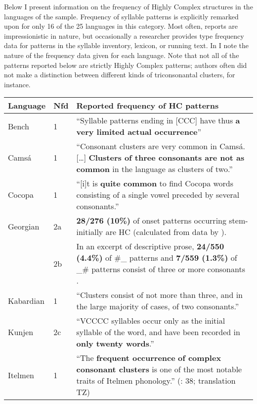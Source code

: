   Below I present information on the frequency of Highly Complex structures in the languages of the sample. Frequency of syllable patterns is explicitly remarked upon for only 16 of the 25 languages in this category. Most often, reports are impressionistic in nature, but occasionally a researcher provides type frequency data for patterns in the syllable inventory, lexicon, or running text. In  I note the nature of the frequency data given for each language. Note that not all of the patterns reported below are strictly Highly Complex patterns; authors often did not make a distinction between different kinds of triconsonantal clusters, for instance.

\begin{sidewaystable}\footnotesize
\begin{tabularx}{\textwidth}{p{1.25cm}lQ}
\lsptoprule
Language & Nfd & Reported frequency of HC patterns\\\midrule
{Bench} & 1 & “Syllable patterns ending in [CCC] have thus \textbf{{a very limited actual occurrence}}” \citep[92]{Rapold2006}\\
{Camsá} & 1 & “Consonant clusters are very common in Camsá. […] \textbf{{Clusters of three consonants are not as common}} in the language as clusters of two.” \citep[81-4]{Howard1967}\\
{Cocopa} & 1 & “[i]t is \textbf{{quite common}} to find Cocopa words consisting of a single vowel preceded by several consonants.” \citep[1]{Bendixen1980}\\
{Georgian} & 2a & \textbf{{28/276 (10\%)}} of onset patterns occurring stem-initially are HC (calculated from data by \citealt[197--205]{Butskhrikidze2002}).\\
            & 2b & In an excerpt of descriptive prose, \textbf{{24/550 (4.4\%)}} of \#\_ patterns and \textbf{{7/559 (1.3\%)}} of \_\# patterns consist of three or more consonants \citep[79-80]{Vogt1958}.\\
{Kabardian} & 1 & “Clusters consist of not more than three, and in the large majority of cases, of two consonants.” \citep[29]{Kuipers1960}\\
{Kunjen} & 2c & “VCCCC syllables occur only as the initial syllable of the word, and have been recorded in \textbf{{only twenty words}}.” \citep[35]{Sommer1969}\\
{Itelmen} & 1 & “The \textbf{{frequent occurrence}} \textbf{{of complex consonant clusters}} is one of the most notable traits of Itelmen phonology.” (\citealt{GeorgVolodin1999}: 38; translation TZ)\\

\end{tabularx}
\end{sidewaystable}
